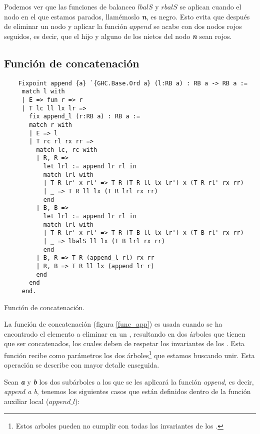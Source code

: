 Podemos ver que las funciones de balanceo \hyperref[lbalS]{$lbalS$} y \hyperref[lbalS]{$rbalS$} se 
aplican cuando el nodo en el que estamos parados, llamémoslo \textbf{\textit{n}}, es negro. Esto 
evita que después de eliminar un nodo y aplicar la funci\'on \hyperref[func_app]{$append$} se acabe 
con dos nodos rojos seguidos, es decir, que el hijo y alguno de los nietos del nodo 
\textbf{\textit{n}} sean rojos.

\subsection{Funci\'on de concatenaci\'on}

\begin{listing}[!ht]
    \centering
    \captionsetup{justification=centering}
    \begin{verbatim}
    Fixpoint append {a} `{GHC.Base.Ord a} (l:RB a) : RB a -> RB a :=
     match l with
     | E => fun r => r
     | T lc ll lx lr =>
       fix append_l (r:RB a) : RB a :=
       match r with
       | E => l
       | T rc rl rx rr =>
         match lc, rc with
         | R, R =>
           let lrl := append lr rl in
           match lrl with
           | T R lr' x rl' => T R (T R ll lx lr') x (T R rl' rx rr)
           | _ => T R ll lx (T R lrl rx rr)
           end
         | B, B =>
           let lrl := append lr rl in
           match lrl with
           | T R lr' x rl' => T R (T B ll lx lr') x (T B rl' rx rr)
           | _ => lbalS ll lx (T B lrl rx rr)
           end
         | B, R => T R (append_l rl) rx rr
         | R, B => T R ll lx (append lr r)
         end
       end
     end.
    \end{verbatim}
    \caption{Funci\'on de concatenaci\'on.}
    \label{func_app}
    \end{listing}

La funci\'on de concatenación (figura \ref{func_app}) es usada cuando se ha encontrado el elemento a 
eliminar en un {\arn}, resultando en dos \'arboles que tienen que ser concatenados, los cuales deben 
de respetar los invariantes de los {\arns}. Esta funci\'on recibe como parámetros los dos 
\'arboles\footnote{Estos arboles pueden no cumplir con todas las invariantes de los {\arns}.} que 
estamos buscando unir. Esta operación se describe con mayor detalle enseguida.

Sean \textbf{\textit{a}} y \textbf{\textit{b}} los dos subárboles a los que se les aplicar\'a la 
funci\'on \emph{append}, es decir, \textit{append a b}, tenemos los siguientes casos que están definidos 
dentro de la funci\'on auxiliar local ($append\_l$):

